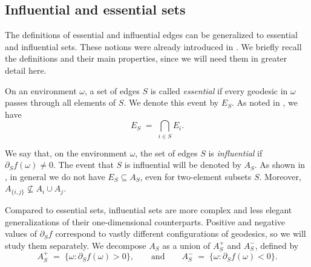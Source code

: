 \documentclass[reqno]{amsart}
\begin{document}

\subsection{Influential and essential sets}\label{subs|DefinitionsHigherOrderInfluentialEssential}
The definitions of essential and influential edges can be generalized to essential and influential sets. These notions were already introduced in \cite{FirstPaper2025}. We briefly recall the definitions and their main properties, since we will need them in greater detail here. 

On an environment $\omega$, a set of edges $S$ is called \emph{essential} if every geodesic in $\omega$ passes through all elements of $S$. We denote this event by $E_S$. As noted in \cite{FirstPaper2025}, we have  
\[
E_S \;=\; \bigcap_{i\in S} E_i .
\]

We say that, on the environment $\omega$, the set of edges $S$ is \emph{influential} if $\partial_S f(\omega)\neq 0$. The event that $S$ is influential will be denoted by $A_S$. As shown in \cite{FirstPaper2025}, in general we do not have $E_S \subseteq A_S$, even for two-element subsets $S$. Moreover, $A_{\{i,j\}} \not\subseteq A_i \cup A_j$.

Compared to essential sets, influential sets are more complex and less elegant generalizations of their one-dimensional counterparts. Positive and negative values of $\partial_S f$ correspond to vastly different configurations of geodesics, so we will study them separately. We decompose $A_S$ as a union of $A_S^+$ and $A_S^-$, defined by
\[
A_S^+ \;=\; \{\omega : \partial_S f(\omega) > 0\}, 
\qquad\text{and}\qquad
A_S^- \;=\; \{\omega : \partial_S f(\omega) < 0\}.
\]
\end{document}
